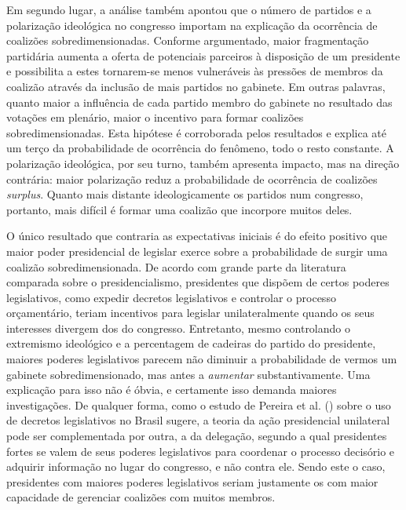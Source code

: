 Em segundo lugar, a análise também apontou que o número de partidos e a polarização ideológica no congresso importam na explicação da ocorrência de coalizões sobredimensionadas. Conforme argumentado, maior fragmentação partidária aumenta a oferta de potenciais parceiros à disposição de um presidente e possibilita a estes tornarem-se menos vulneráveis às pressões de membros da coalizão através da inclusão de mais partidos no gabinete. Em outras palavras, quanto maior a influência de cada partido membro do gabinete no resultado das votações em plenário, maior o incentivo para formar coalizões sobredimensionadas. Esta hipótese é corroborada pelos resultados e explica até um terço da probabilidade de ocorrência do fenômeno, todo o resto constante. A polarização ideológica, por seu turno, também apresenta impacto, mas na direção contrária: maior polarização reduz a probabilidade de ocorrência de coalizões \textit{surplus}. Quanto mais distante ideologicamente os partidos num congresso, portanto, mais difícil é formar uma coalizão que incorpore muitos deles.

O único resultado que contraria as expectativas iniciais é do efeito positivo que maior poder presidencial de legislar exerce sobre a probabilidade de surgir uma coalizão sobredimensionada. De acordo com grande parte da literatura comparada sobre o presidencialismo, presidentes que dispõem de certos poderes legislativos, como expedir decretos legislativos e controlar o processo orçamentário, teriam incentivos para legislar unilateralmente quando os seus interesses divergem dos do congresso. Entretanto, mesmo controlando o extremismo ideológico e a percentagem de cadeiras do partido do presidente, maiores poderes legislativos parecem não diminuir a probabilidade de vermos um gabinete sobredimensionado, mas antes a \textit{aumentar} substantivamente. Uma explicação para isso não é óbvia, e certamente isso demanda maiores investigações. De qualquer forma, como o estudo de Pereira et al. (\citeyear{pereira2005}) sobre o uso de decretos legislativos no Brasil sugere, a teoria da ação presidencial unilateral pode ser complementada por outra, a da delegação, segundo a qual presidentes fortes se valem de seus poderes legislativos para coordenar o processo decisório e adquirir informação no lugar do congresso, e não contra ele. Sendo este o caso, presidentes com maiores poderes legislativos seriam justamente os com maior capacidade de gerenciar coalizões com muitos membros.

